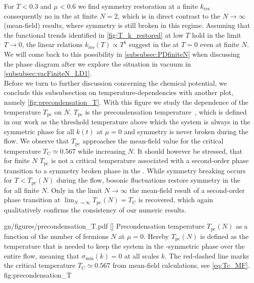 	For $T<0.3$ and $\mu<0.6$ we find symmetry restoration at a finite $k_\mathrm{res}$ \dash{} consequently no \ssb{} in the \ir{} \dash{} at finite $N = 2$, which is in direct contrast to the $N \rightarrow \infty$ (mean-field) results, where symmetry is still broken in this regime. Assuming that the functional trends identified in \cref{fig:T_k_restored} at low $T$ hold in the limit $T \rightarrow 0$, the linear relations $k_\mathrm{res} ( T ) \propto T^1$ suggest \ssb{} in the \ir{} at $T = 0$ even at finite $N$. We will come back to this possibility in \cref{subsubsec:PDfiniteN} when discussing the phase diagram after we explore the situation in vacuum in \cref{subsubsec:vacFiniteN_LD1}.\\

	Before we turn to further discussion concerning the chemical potential, we conclude this subsubsection on temperature-dependencies with another plot, namely \cref{fig:precondensation_T}. With this figure we study the dependence of the temperature $T_\mathrm{pc}$ on $N$. $T_\mathrm{pc}$ is the precondensation temperature~\cite{Boettcher:2012cm,Boettcher:2012dh,Boettcher:2013kia,Boettcher:2014tfa,Roscher:2015xha,Khan:2015puu}, which is defined in our work as the threshold temperature above which the system is always in the symmetric phase for all $k(t)$ at $\mu = 0$ and \ZII{} symmetry is never broken during the \frg{} flow. We observe that 
	$T_\mathrm{pc}$ approaches the mean-field value for the critical temperature $T_\mathrm{C} \simeq 0.567$ while increasing $N$. It should however be stressed, that for finite $N$ $T_\mathrm{pc}$ is not a critical temperature associated with a second-order phase transition to a symmetry broken phase in the \ir{}. While symmetry breaking occurs for $T < T_\mathrm{pc} ( N )$ during the \frg{} flow, bosonic fluctuations restore symmetry in the \ir{} for all finite $N$. Only in the limit $N \rightarrow \infty$ the mean-field result of a second-order phase transition at $\lim_{N \rightarrow \infty} T_\mathrm{pc} ( N ) = T_\mathrm{C}$ is recovered, which again qualitatively confirms the consistency of our numeric results.\clearpage

\halfWidthFigure%
	{gn/figures/precondensation_T.pdf}
	[]
	{%
		Precondensation temperature $T_\mathrm{pc} ( N )$ as a function of the number of fermions $N$ at $\mu = 0$. Hereby $T_\mathrm{pc} ( N )$ is defined as the temperature that is needed to keep the system in the \ZII{}-symmetric phase over the entire \frg{} flow, meaning that $\sigma_\mathrm{min} ( k ) = 0$ at all scales $k$. The {red-dashed} line marks the critical temperature $T_\mathrm{C}\simeq 0.567$ from mean-field calculations, see \cref{eq:Tc_MF}.
	}%
	{fig:precondensation_T}

